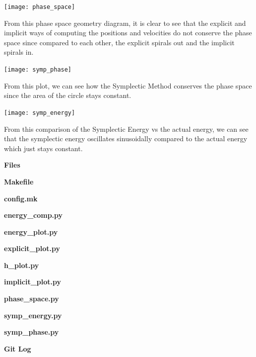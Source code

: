 \documentclass[10pt]{report}
\begin{document}
\texttt{[image: phase\_space]}

From this phase space geometry diagram, it is clear to see that the explicit and implicit ways of computing the positions and velocities do not conserve the phase space since compared to each other, the explicit spirals out and the implicit spirals in.

\texttt{[image: symp\_phase]}

From this plot, we can see how the Symplectic Method conserves the phase space since the area of the circle stays constant.

\texttt{[image: symp\_energy]}

From this comparison of the Symplectic Energy vs the actual energy, we can see that the symplectic energy oscillates sinusoidally compared to the actual energy which just stays constant. 

\bigskip

\textbf{Files}

\textbf{Makefile}


\bigskip

\textbf{config.mk}



\bigskip

\textbf{energy\_comp.py}



\bigskip

\textbf{energy\_plot.py}



\bigskip

\textbf{explicit\_plot.py}



\bigskip

\textbf{h\_plot.py}



\bigskip

\textbf{implicit\_plot.py}



\bigskip

\textbf{phase\_space.py}



\bigskip

\textbf{symp\_energy.py}



\bigskip

\textbf{symp\_phase.py}



\bigskip

\textbf{Git Log}


 
\end{document}
